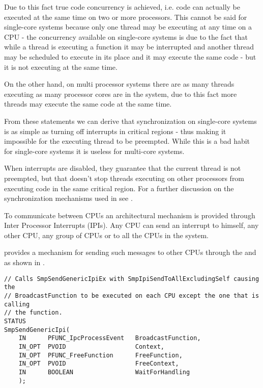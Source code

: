 \begin{appendices}
Due to this fact true code concurrency is achieved, i.e. code can actually be executed at the same
time on two or more processors. This cannot be said for single-core systems because only one thread
may be executing at any time on a CPU - the concurrency available on single-core systems is due to
the fact that while a thread is executing a function it may be interrupted and another thread may
be scheduled to execute in its place and it may execute the same code - but it is not executing at
the same time.

On the other hand, on multi processor systems there are as many threads executing as many processor
cores are in the system, due to this fact more threads may execute the same code at the same time.

From these statements we can derive that synchronization on single-core systems is as simple as
turning off interrupts in critical regions - thus making it impossible for the executing thread to
be preempted. While this is a bad habit for single-core systems it is useless for multi-core systems.

When interrupts are disabled, they guarantee that the current thread is not preempted, but that
doesn't stop threads executing on other processors from executing code in the same critical region.
For a further discussion on the synchronization mechanisms used in \projectname see
.

To communicate between CPUs an architectural mechanism is provided through Inter Processor
Interrupts (IPIs). Any CPU can send an interrupt to himself, any other CPU, any group of CPUs or
to all the CPUs in the system.

\projectname provides a mechanism for sending such messages to other CPUs through the
 and  as shown in .

\begin{lstlisting}[caption={IPI functions},label={lst:SmpIpi}]
// Calls SmpSendGenericIpiEx with SmpIpiSendToAllExcludingSelf causing the
// BroadcastFunction to be executed on each CPU except the one that is calling
// the function.
STATUS
SmpSendGenericIpi(
    IN      PFUNC_IpcProcessEvent   BroadcastFunction,
    IN_OPT  PVOID                   Context,
    IN_OPT  PFUNC_FreeFunction      FreeFunction,
    IN_OPT  PVOID                   FreeContext,
    IN      BOOLEAN                 WaitForHandling
    );


\end{lstlisting}
\end{appendices}
